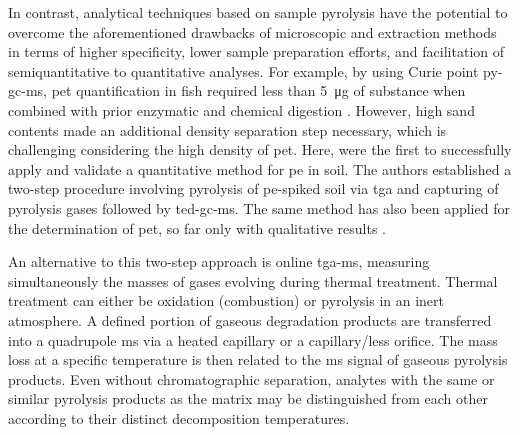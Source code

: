 In contrast, analytical techniques based on sample pyrolysis have the potential to overcome the aforementioned drawbacks of microscopic and extraction methods in terms of higher specificity, lower sample preparation efforts, and facilitation of semiquantitative to quantitative analyses.
For example, by using Curie point \ac{py-gc-ms}, \ac{pet} quantification in fish required less than \SI{5}{\micro\gram} of substance when combined with prior enzymatic and chemical digestion \citep{FischerSimultaneous2017}.
However, high sand contents made an additional density separation step necessary, which is challenging considering the high density of \ac{pet}. Here, \citet{DumichenAnalysis2015} were the first to successfully apply and validate a quantitative method for \ac{pe} in soil.
The authors established a two-step procedure involving pyrolysis of \ac{pe}-spiked soil via \ac{tga} and capturing of pyrolysis gases followed by \ac{ted-gc-ms}. The same method has also been applied for the determination of \ac{pet}, so far only with qualitative results \citep{DumichenFast2017}.

An alternative to this two-step approach is online \ac{tga-ms}, measuring simultaneously the masses of gases evolving during thermal treatment. Thermal treatment can either be oxidation (combustion) or pyrolysis in an inert  atmosphere. A defined portion of gaseous degradation products are transferred into a quadrupole \ac{ms} via a heated capillary or a capillary\-/less orifice. The mass loss at a specific temperature is then related to the \ac{ms} signal of gaseous pyrolysis products.
Even without chromatographic separation, analytes with the same or similar pyrolysis products as the matrix may be distinguished from each other according to their distinct decomposition temperatures.

